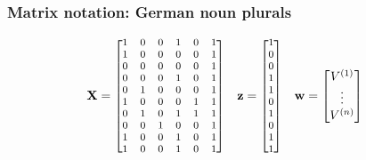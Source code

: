 \begin{frame}
  \frametitle{Matrix notation: German noun plurals}
  
  \ungap[2]
  \begin{align*}
    \vX &=
    \footnotesize\begin{bmatrix}
      1 & 0 & 0 & 1 & 0 & 1 \\ 
      1 & 0 & 0 & 0 & 0 & 1 \\ 
      0 & 0 & 0 & 0 & 0 & 1 \\ 
      0 & 0 & 0 & 1 & 0 & 1 \\ 
      0 & 1 & 0 & 0 & 0 & 1 \\ 
      1 & 0 & 0 & 0 & 1 & 1 \\ 
      0 & 1 & 0 & 1 & 1 & 1 \\ 
      0 & 0 & 1 & 0 & 0 & 1 \\      
      1 & 0 & 0 & 1 & 0 & 1 \\ 
      1 & 0 & 0 & 1 & 0 & 1
    \end{bmatrix}
    &
    \vz &=
    \footnotesize\begin{bmatrix}
      1  \\
      0  \\
      0  \\
      1  \\
      1  \\
      0  \\
      1  \\
      0  \\
      1  \\
      1 
    \end{bmatrix}
    &
    \vw &=
    \begin{bmatrix}
      V\psup{1} \\
      \vdots \\
      V\psup{n}
    \end{bmatrix}
  \end{align*}
  

\end{frame}
